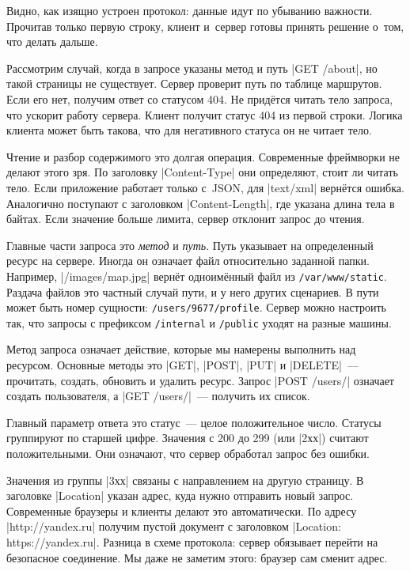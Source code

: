 Видно, как изящно устроен протокол: данные идут по убыванию важности. Прочитав
только первую строку, клиент и~сервер готовы принять решение о~том, что делать
дальше.


Рассмотрим случай, когда в запросе указаны метод и путь \spverb|GET /about|, но
такой страницы не существует. Сервер проверит путь по таблице маршрутов. Если
его нет, получим ответ со статусом 404. Не прид\"{е}тся читать тело запроса, что
ускорит работу сервера. Клиент получит статус 404 из первой строки. Логика
клиента может быть такова, что для негативного статуса он не читает тело.

Чтение и разбор содержимого это долгая операция. Современные фреймворки не
делают этого зря. По заголовку \spverb|Content-Type| они определяют, стоит ли
читать тело. Если приложение работает только с~JSON, для \spverb|text/xml|
верн\"{е}тся ошибка. Аналогично поступают с заголовком \spverb|Content-Length|, где
указана длина тела в байтах. Если значение больше лимита, сервер отклонит запрос
до чтения.


Главные части запроса это \emph{метод} и \emph{путь}. Путь указывает на
определенный ресурс на сервере. Иногда он означает файл относительно заданной
папки. Например, \spverb|/images/map.jpg| верн\"{е}т одноим\"{е}нный файл из
\verb|/var/www/static|. Раздача файлов это частный случай пути, и у него других
сценариев. В пути может быть номер сущности: \verb|/users/9677/profile|. Сервер
можно настроить так, что запросы с префиксом \verb|/internal| и \verb|/public|
уходят на разные машины.

Метод запроса означает действие, которые мы намерены выполнить над
ресурсом. Основные методы это \spverb|GET|, \spverb|POST|, \spverb|PUT| и
\spverb|DELETE|~--- прочитать, создать, обновить и удалить ресурс. Запрос
\spverb|POST /users/| означает создать пользователя, а \spverb|GET /users/|~---
получить их список.

Главный параметр ответа это статус~--- целое положительное число. Статусы
группируют по старшей цифре. Значения с 200 до 299 (или \spverb|2хх|) считают
положительными. Они означают, что сервер обработал запрос без ошибки.

Значения из группы \spverb|3хх| связаны с направлением на другую страницу. В
заголовке \spverb|Location| указан адрес, куда нужно отправить новый
запрос. Современные браузеры и клиенты делают это автоматически. По адресу
\spverb|http://yandex.ru| получим пустой документ с заголовком \spverb|Location:
https://yandex.ru|. Разница в схеме протокола: сервер обязывает перейти на
безопасное соединение. Мы даже не заметим этого: браузер сам сменит адрес.

